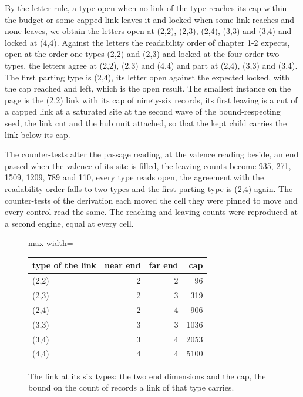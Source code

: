 \begin{chproof}[exact]
By the letter rule, a type open when no link of the type reaches its cap within the budget or some capped link leaves it and locked when some link reaches and none leaves, we obtain the letters open at (2,2), (2,3), (2,4), (3,3) and (3,4) and locked at (4,4). Against the letters the readability order of chapter 1-2 expects, open at the order-one types (2,2) and (2,3) and locked at the four order-two types, the letters agree at (2,2), (2,3) and (4,4) and part at (2,4), (3,3) and (3,4). The first parting type is (2,4), its letter open against the expected locked, with the cap reached and left, which is the open result. The smallest instance on the page is the (2,2) link with its cap of ninety-six records, its first leaving is a cut of a capped link at a saturated site at the second wave of the bound-respecting seed, the link cut and the hub unit attached, so that the kept child carries the link below its cap.

The counter-tests alter the passage reading, at the valence reading beside, an end passed when the valence of its site is filled, the leaving counts become 935, 271, 1509, 1209, 789 and 110, every type reads open, the agreement with the readability order falls to two types and the first parting type is (2,4) again. The counter-tests of the derivation each moved the cell they were pinned to move and every control read the same. The reaching and leaving counts were reproduced at a second engine, equal at every cell.
\end{chproof}
\begin{figure}[h]\centering
\begin{adjustbox}{max width=\linewidth}\begin{tabular}{lrrr}\toprule
type of the link & near end & far end & cap \\ \midrule
(2,2) & 2 & 2 & 96 \\
(2,3) & 2 & 3 & 319 \\
(2,4) & 2 & 4 & 906 \\
(3,3) & 3 & 3 & 1036 \\
(3,4) & 3 & 4 & 2053 \\
(4,4) & 4 & 4 & 5100 \\ \bottomrule
\end{tabular}\end{adjustbox}
\caption{The link at its six types: the two end dimensions and the cap, the bound on the count of records a link of that type carries.}
\end{figure}
